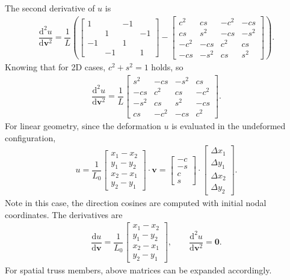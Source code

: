 \documentclass[11pt]{article}
\begin{document}
The second derivative of $u$ is
\begin{gather}
\dfrac{\mathrm{d}^2u}{\mathrm{d}\mathbf{v}^2}=\dfrac{1}{L}\left(\begin{bmatrix}
	1  &    & -1 &    \\
	   & 1  &    & -1 \\
	-1 &    & 1  &    \\
	   & -1 &    & 1
\end{bmatrix}-\begin{bmatrix}
	c^2  & cs   & -c^2 & -cs  \\
	cs   & s^2  & -cs  & -s^2 \\
	-c^2 & -cs  & c^2  & cs   \\
	-cs  & -s^2 & cs   & s^2
\end{bmatrix}\right).
\end{gather}
Knowing that for 2D cases, $c^2+s^2=1$ holds, so
\begin{gather*}
\dfrac{\mathrm{d}^2u}{\mathrm{d}\mathbf{v}^2}=\dfrac{1}{L}\begin{bmatrix}
	s^2  & -cs  & -s^2 & cs   \\
	-cs  & c^2  & cs   & -c^2 \\
	-s^2 & cs   & s^2  & -cs  \\
	cs   & -c^2 & -cs  & c^2
\end{bmatrix}.
\end{gather*}
For linear geometry, since the deformation $u$ is evaluated in the undeformed configuration,
\begin{gather}
u=\dfrac{1}{L_0}\begin{bmatrix}
x_1-x_2\\y_1-y_2\\x_2-x_1\\y_2-y_1
\end{bmatrix}\cdot\mathbf{v}=\begin{bmatrix}
-c\\-s\\c\\s
\end{bmatrix}\cdot\begin{bmatrix}
\Delta{}x_1\\\Delta{}y_1\\\Delta{}x_2\\\Delta{}y_2
\end{bmatrix}.
\end{gather}
Note in this case, the direction cosines are computed with initial nodal coordinates. The derivatives are
\begin{gather}
\dfrac{\mathrm{d}u}{\mathrm{d}\mathbf{v}}=\dfrac{1}{L_0}\begin{bmatrix}
x_1-x_2\\y_1-y_2\\x_2-x_1\\y_2-y_1
\end{bmatrix},\qquad\dfrac{\mathrm{d}^2u}{\mathrm{d}\mathbf{v}^2}=\mathbf{0}.
\end{gather}
For spatial truss members, above matrices can be expanded accordingly.
\end{document}
